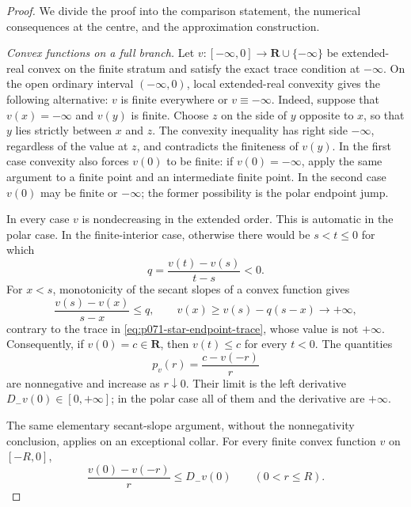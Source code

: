 
\begin{proof}
We divide the proof into the comparison statement, the numerical
consequences at the centre, and the approximation construction.

\medskip\noindent
\emph{Convex functions on a full branch.}
Let \(v:[-\infty,0]\to\mathbf R\cup\{-\infty\}\) be extended-real
convex on the finite stratum and satisfy the exact trace condition at
\(-\infty\).  On the open ordinary interval \((-\infty,0)\), local
extended-real convexity gives the following alternative: \(v\) is
finite everywhere or \(v\equiv-\infty\).  Indeed, suppose that
\(v(x)=-\infty\) and \(v(y)\) is finite.  Choose \(z\) on the side of
\(y\) opposite to \(x\), so that \(y\) lies strictly between \(x\) and
\(z\).  The convexity inequality has right side \(-\infty\), regardless
of the value at \(z\), and contradicts the finiteness of \(v(y)\).
In the first case convexity also forces \(v(0)\) to be finite: if
\(v(0)=-\infty\), apply the same argument to a finite point and an
intermediate finite point.  In the second case \(v(0)\) may be finite
or \(-\infty\); the former possibility is the polar endpoint jump.

In every case \(v\) is nondecreasing in the extended order.  This is
automatic in the polar case.  In the finite-interior case, otherwise
there would be \(s<t\leq0\) for which
\[
                       q=\frac{v(t)-v(s)}{t-s}<0.
\]
For \(x<s\), monotonicity of the secant slopes of a convex function gives
\[
             \frac{v(s)-v(x)}{s-x}\leq q,
             \qquad
             v(x)\geq v(s)-q(s-x)\longrightarrow+\infty,
\]
contrary to the trace in
\eqref{eq:p071-star-endpoint-trace}, whose value is not \(+\infty\).
Consequently, if \(v(0)=c\in\mathbf R\), then \(v(t)\leq c\) for
every \(t<0\).  The quantities
\begin{equation}
                  p_v(r)=\frac{c-v(-r)}r
\label{eq:p071-star-secant-slope}
\end{equation}
are nonnegative and increase as \(r\downarrow0\).  Their limit is the
left derivative \(D_-v(0)\in[0,+\infty]\); in the polar case all of
them and the derivative are \(+\infty\).

The same elementary secant-slope argument, without the nonnegativity
conclusion, applies on an exceptional collar.  For every finite convex
function \(v\) on \([-R,0]\),
\begin{equation}
 \frac{v(0)-v(-r)}r\leq D_-v(0)
 \qquad(0<r\leq R).
 \label{eq:p071-star-secant-below-derivative}
\end{equation}


\end{proof}
